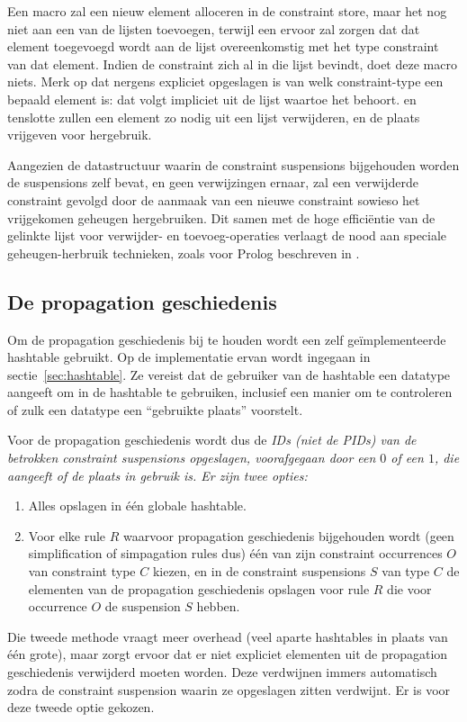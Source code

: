 Een  macro zal een nieuw element alloceren in de constraint store, maar het nog niet aan een van de lijsten toevoegen, terwijl een  ervoor zal zorgen dat dat element toegevoegd wordt aan de lijst overeenkomstig met het type constraint van dat element. Indien de constraint zich al in die lijst bevindt, doet deze macro niets. Merk op dat nergens expliciet opgeslagen is van welk constraint-type een bepaald element is: dat volgt impliciet uit de lijst waartoe het behoort.  en  tenslotte zullen een element zo nodig uit een lijst verwijderen, en de plaats vrijgeven voor hergebruik.

Aangezien de datastructuur waarin de constraint suspensions bijgehouden worden de suspensions zelf bevat, en geen verwijzingen ernaar, zal een verwijderde constraint gevolgd door de aanmaak van een nieuwe constraint sowieso het vrijgekomen geheugen hergebruiken. Dit samen met de hoge effici\"entie van de gelinkte lijst voor verwijder- en toevoeg-operaties verlaagt de nood aan speciale geheugen-herbruik technieken, zoals voor Prolog beschreven in \cite{jon:memory_reuse}.

\subsection{De propagation geschiedenis} \label{sec:prophist}


Om de propagation geschiedenis bij te houden wordt een zelf ge\"implementeerde hashtable gebruikt. Op de implementatie ervan wordt ingegaan in sectie~\ref{sec:hashtable}. Ze vereist dat de gebruiker van de hashtable een datatype aangeeft om in de hashtable te gebruiken, inclusief een manier om te controleren of zulk een datatype een ``gebruikte plaats'' voorstelt.

Voor de propagation geschiedenis wordt dus de \em{ID}s (niet de \em{PID}s) van de betrokken constraint suspensions opgeslagen, voorafgegaan door een $0$ of een $1$, die aangeeft of de plaats in gebruik is. Er zijn twee opties: \begin{enumerate}
  \item Alles opslagen in \'e\'en globale hashtable.
  \item Voor elke rule $R$ waarvoor propagation geschiedenis bijgehouden wordt (geen simplification of simpagation rules dus) \'e\'en van zijn constraint occurrences $O$ van constraint type $C$ kiezen, en in de constraint suspensions $S$ van type $C$ de elementen van de propagation geschiedenis opslagen voor rule $R$ die voor occurrence $O$ de suspension $S$ hebben.
\end{enumerate}
Die tweede methode vraagt meer overhead (veel aparte hashtables in plaats van \'e\'en grote), maar zorgt ervoor dat er niet expliciet elementen uit de propagation geschiedenis verwijderd moeten worden. Deze verdwijnen immers automatisch zodra de constraint suspension waarin ze opgeslagen zitten verdwijnt. Er is voor deze tweede optie gekozen.

